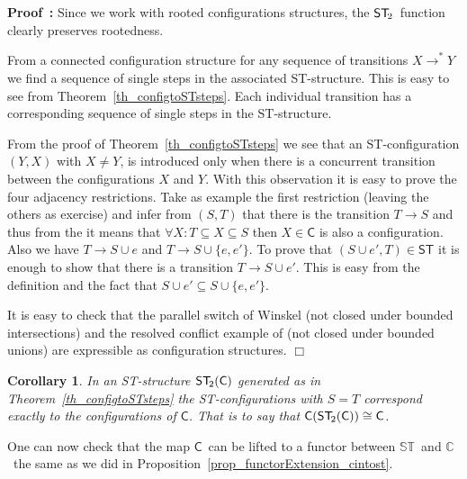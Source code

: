 \documentclass[submission,copyright,creativecommons]{eptcs}
\newtheorem{corollary}[theorem]{Corollary}
\newenvironment{proof}[1][\!\!\,]{\vspace{1ex}\noindent\textbf{Proof #1: }}{\hfill$\Box$\vspace{2ex}}
\newcommand{\cp}[1]{}
\newcommand\C{\ensuremath{\mathsf{C}}}
\newcommand\allC{\ensuremath{\mathbb{C}}}
\newcommand\ST{\ensuremath{\mathsf{ST}}}
\newcommand\allST{\ensuremath{\mathbb{ST}}}
\newcommand\isomorphic{\ensuremath{\cong}}
\newcommand\cintostSecond{\ensuremath{\mathsf{ST}_{\hspace{-0.4ex}2}}}
\newcommand\stintoc{\ensuremath{\mathsf{C}}}
\newcommand\STofC[1]{\ensuremath{\cintostSecond(#1)}}
\newcommand{\transition}[1]{\ensuremath{\xrightarrow{#1}}}
\begin{document}
\begin{proof}
Since we work with rooted configurations structures, the \cintostSecond\ function clearly preserves rootedness.

From a connected configuration structure for any sequence of transitions $X\transition{}^{*}Y$ we find a sequence of single steps in the associated ST-structure. This is easy to see from Theorem~\ref{th_configtoSTsteps}. Each individual transition has a corresponding sequence of single steps in the ST-structure.

From the proof of Theorem~\ref{th_configtoSTsteps} we see that an ST-configuration $(Y,X)$ with $X\neq Y$, is introduced only when there is a concurrent transition between the configurations $X$ and $Y$. With this observation it is easy to prove the four adjacency restrictions. Take as example the first restriction (leaving the others as exercise) and infer from $(S,T)$ that there is the transition $T\transition{}S$ and thus from the \cite[Def.2.1]{GlabbeekP09configStruct} it means that $\forall X: T\subseteq X\subseteq S$ then $X\in\C$ is also a configuration. Also we have $T\transition{}S\cup e$ and $T\transition{}S\cup \{e,e'\}$. To prove that $(S\cup e',T)\in\ST$ it is enough to show that there is a transition $T\transition{}S\cup e'$. This is easy from the definition \cite[Def.2.1]{GlabbeekP09configStruct} and the fact that $S\cup e' \subseteq S\cup \{e,e'\}$.

It is easy to check that the parallel switch of Winskel \cite{Winskel86} (not closed under bounded intersections) and the resolved conflict example of \cite[Ex.2]{GlabbeekP09configStruct} (not closed under bounded unions) are expressible as configuration structures.
\end{proof}



\begin{corollary}\label{cor_counit_C_ST}
In an ST-structure $\STofC{\C}$ generated as in Theorem~\ref{th_configtoSTsteps} the ST-con\-figurations with $S=T$ correspond exactly to the configurations of $\C$. That is to say that $\stintoc(\STofC{\C})\isomorphic\C$.
\end{corollary}

\cp{The above equivalence should also be proven as an adjunction between the two categories.}

One can now check that the map \stintoc\ can be lifted to a functor between \allST\ and \allC\ the same as we did in Proposition~\ref{prop_functorExtension_cintost}.
\end{document}
